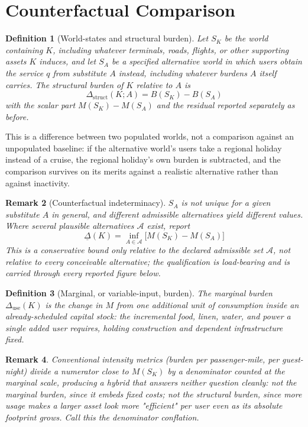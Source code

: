 \documentclass[11pt]{article}
\newtheorem{definition}{Definition}[section]
\newtheorem{remark}[definition]{Remark}
\begin{document}
\section{Counterfactual Comparison}

\begin{definition}[World-states and structural burden]
Let $S_K$ be the world containing $K$, including whatever terminals, roads, flights, or other supporting assets $K$ induces, and let $S_A$ be a specified alternative world in which users obtain the service $q$ from substitute $A$ instead, including whatever burdens $A$ itself carries. The structural burden of $K$ relative to $A$ is
\[
\Delta_{\text{struct}}(K;A) = B(S_K) - B(S_A)
\]
with the scalar part $M(S_K) - M(S_A)$ and the residual reported separately as before.
\end{definition}

This is a difference between two populated worlds, not a comparison against an unpopulated baseline: if the alternative world's users take a regional holiday instead of a cruise, the regional holiday's own burden is subtracted, and the comparison survives on its merits against a realistic alternative rather than against inactivity.

\begin{remark}[Counterfactual indeterminacy]
$S_A$ is not unique for a given substitute $A$ in general, and different admissible alternatives yield different values. Where several plausible alternatives $\mathcal{A}$ exist, report
\[
\underline{\Delta}(K) = \inf_{A \in \mathcal{A}} \big[M(S_K) - M(S_A)\big]
\]
This is a conservative bound only relative to the declared admissible set $\mathcal{A}$, not relative to every conceivable alternative; the qualification is load-bearing and is carried through every reported figure below.
\end{remark}

\begin{definition}[Marginal, or variable-input, burden]
The marginal burden $\Delta_{\text{use}}(K)$ is the change in $M$ from one additional unit of consumption inside an already-scheduled capital stock: the incremental food, linen, water, and power a single added user requires, holding construction and dependent infrastructure fixed.
\end{definition}

\begin{remark}
Conventional intensity metrics (burden per passenger-mile, per guest-night) divide a numerator close to $M(S_K)$ by a denominator counted at the marginal scale, producing a hybrid that answers neither question cleanly: not the marginal burden, since it embeds fixed costs; not the structural burden, since more usage makes a larger asset look more "efficient" per user even as its absolute footprint grows. Call this the \emph{denominator conflation}.
\end{remark}
\end{document}
